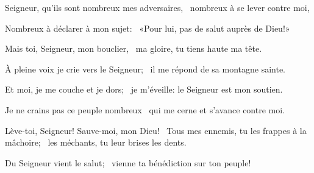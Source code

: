 \item Seigneur, qu'ils sont nombreux mes adversaires,~\psstar{} nombreux à se lever contre moi,
\item Nombreux à déclarer à mon sujet:~\psstar{} «Pour lui, pas de salut auprès de Dieu!»
\item Mais toi, Seigneur, mon bouclier,~\psstar{} ma gloire, tu tiens haute ma tête.
\item À pleine voix je crie vers le Seigneur;~\psstar{} il me répond de sa montagne sainte.
\item Et moi, je me couche et je dors;~\psstar{} je m'éveille: le Seigneur est mon soutien.
\item Je ne crains pas ce peuple nombreux~\psstar{} qui me cerne et s'avance contre moi.
\item Lève-toi, Seigneur! Sauve-moi, mon Dieu!~\pscross{} Tous mes ennemis, tu les frappes à la mâchoire;~\psstar{} les méchants, tu leur brises les dents.
\item Du Seigneur vient le salut;~\psstar{} vienne ta bénédiction sur ton peuple!